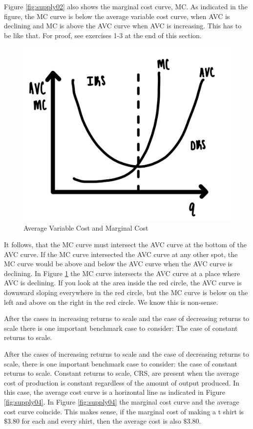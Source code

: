 \documentclass[
]{book}
\begin{document}
Figure \ref{fig:supply02} also shows the marginal cost curve, MC. As indicated in the figure, the MC curve is below the average variable cost curve, when AVC is declining and MC is above the AVC curve when AVC is increasing. This has to be like that. For proof, see exercises 1-3 at the end of this section.

\begin{figure}

{\centering \includegraphics[width=0.75\linewidth]{img/supply/fig3} 

}

\caption{Average Variable Cost and Marginal Cost}\label{fig:supply03}
\end{figure}

It follows, that the MC curve must intersect the AVC curve at the bottom of the AVC curve. If the MC curve intersected the AVC curve at any other spot, the MC curve would be above and below the AVC curve when the AVC curve is declining. In Figure \ref{fig:supply03} the MC curve intersects the AVC curve at a place where AVC is declining. If you look at the area inside the red circle, the AVC curve is downward sloping everywhere in the red circle, but the MC curve is below on the left and above on the right in the red circle. We know this is non-sense.

After the cases in increasing returns to scale and the case of decreasing returns to scale there is one important benchmark case to consider: The case of constant returns to scale.

After the cases of increasing returns to scale and the case of decreasing returns to scale, there is one important benchmark case to consider: the case of constant returns to scale. Constant returns to scale, CRS, are present when the average cost of production is constant regardless of the amount of output produced. In this case, the average cost curve is a horizontal line as indicated in Figure \ref{fig:supply04}. In Figure \ref{fig:supply04} the marginal cost curve and the average cost curve coincide. This makes sense, if the marginal cost of making a t shirt is \(\$3.80\) for each and every shirt, then the average cost is also \(\$3.80\).
\end{document}
